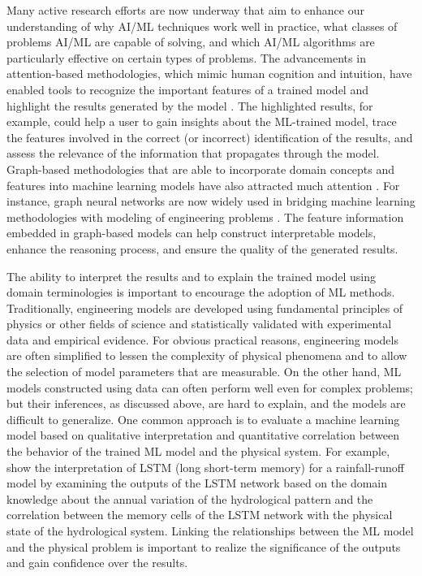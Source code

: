 Many active research efforts are now underway that aim to enhance our understanding of why AI/ML techniques work well in practice, what classes of problems AI/ML are capable of solving, and which AI/ML algorithms are particularly effective on certain types of problems. The advancements in attention-based methodologies, which mimic human cognition and intuition, have enabled tools to recognize the important features of a trained model and highlight the results generated by the model \citep{Xu2015show,zhou2016learning,kafle2017visual,nakka2018deep}. The highlighted results, for example, could help a user to gain insights about the ML-trained model, trace the features involved in the correct (or incorrect) identification of the results, and assess the relevance of the information that propagates through the model. Graph-based methodologies that are able to incorporate domain concepts and features into machine learning models have also attracted much attention \citep{Nickel et al., 2016}\citep{koller2009probabilistic, baru2017open, hamilton2017representation, wu2020comprehensive}. For instance, graph neural networks are now widely used in bridging machine learning methodologies with modeling of engineering problems \citep{seo2019differentiable,park2019physicsinduced}. The feature information embedded in graph-based models can help construct interpretable models, enhance the reasoning process, and ensure the quality of the generated results. 

The ability to interpret the results and to explain the trained model using domain terminologies is important to encourage the adoption of ML methods. Traditionally, engineering models are developed using fundamental principles of physics or other fields of science and statistically validated with experimental data and empirical evidence. For obvious practical reasons, engineering models are often simplified to lessen the complexity of physical phenomena and to allow the selection of model parameters that are measurable. On the other hand, ML models constructed using data can often perform well even for complex problems; but their inferences, as discussed above, are hard to explain, and the models are difficult to generalize. One common approach is to evaluate a machine learning model based on qualitative interpretation and quantitative correlation between the behavior of the trained ML model and the physical system. For example, \cite{kratzert2019neuralhydrology} show the interpretation of LSTM (long short-term memory) for a rainfall-runoff model by examining the outputs of the LSTM network based on the domain knowledge about the annual variation of the hydrological pattern and the correlation between the memory cells of the LSTM network with the physical state of the hydrological system. Linking the relationships between the ML model and the physical problem is important to realize the significance of the outputs and gain confidence over the results. 

